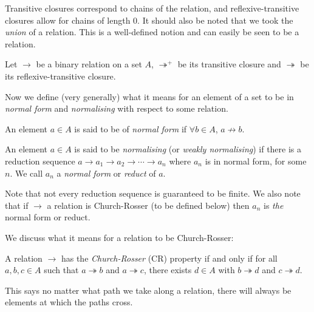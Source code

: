 \begin{remark}
    Transitive closures correspond to chains of the relation, and reflexive-transitive closures allow for chains of length $0$. It should also be noted that we took the \emph{union} of a relation. This is a well-defined notion and can easily be seen to be a relation.
\end{remark}

Let $\to$ be a binary relation on a set $A$, $\twoheadrightarrow^+$ be its transitive closure and $\twoheadrightarrow$ be its reflexive-transitive closure.

Now we define (very generally) what it means for an element of a set to be in \emph{normal form} and \emph{normalising} with respect to some relation.

\begin{defin}
    An element $a \in A$ is said to be of \emph{normal form} if $\forall b \in A$, $a {\not \to} b$.
\end{defin}

\begin{defin}
    An element $a \in A$ is said to be \emph{normalising} (or \emph{weakly normalising}) if there is a reduction sequence $a \to a_1 \to a_2 \to \cdots \to a_n$ where $a_n$ is in normal form, for some $n$. We call $a_n$ a \emph{normal form} or \emph{reduct} of $a$.
\end{defin}

% 
\begin{remark}
    Note that not every reduction sequence is guaranteed to be finite. We also note that if $\to$ a relation is Church-Rosser (to be defined below) then $a_n$ is \emph{the} normal form or reduct.
\end{remark}

We discuss what it means for a relation to be Church-Rosser:

\begin{defin}
    A relation $\to$ has the \emph{Church-Rosser} (CR) property if and only if for all $a,b,c \in A$ such that $a \twoheadrightarrow b$ and $a \twoheadrightarrow c$, there exists $d \in A$ with $b \twoheadrightarrow d$ and $c \twoheadrightarrow d$.
\end{defin}

\begin{remark}
    This says no matter what path we take along a relation, there will always be elements at which the paths cross.
\end{remark}

